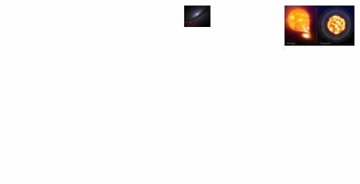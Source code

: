 \documentclass[compress]{beamer}
\begin{document}
\begingroup
{}
\begin{frame}
\begin{columns}

\textcolor{white}{{\bf Type 1-A supernovae} are a tool for measuring distance.}

\vspace{0.1 cm}
\textcolor{white}{A white dwarf star accretes matter from its giant com- panion and explodes the moment it has acquired the critical mass.}

\vspace{0.1 cm}
\textcolor{white}{Thus, we know exactly how large and how bright it was.}

\vspace{0.5 cm}
\includegraphics[width=\linewidth]{pictures/sn1994d_circled.png}

\centering \textcolor{white}{Artist's conception}

\vspace{0.1 cm}
\includegraphics[width=\linewidth]{pictures/type1a_supernova.jpg}


\end{columns}
\end{frame}
\end{document}
